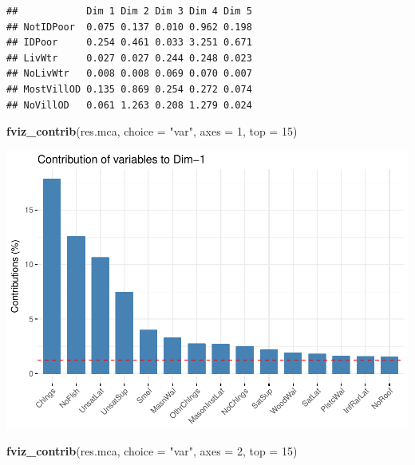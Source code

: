 \documentclass[11pt,]{article}
\newenvironment{Shaded}{\begin{snugshade}}{\end{snugshade}}
\newcommand{\DataTypeTok}[1]{\textcolor[rgb]{0.13,0.29,0.53}{#1}}
\newcommand{\DecValTok}[1]{\textcolor[rgb]{0.00,0.00,0.81}{#1}}
\newcommand{\KeywordTok}[1]{\textcolor[rgb]{0.13,0.29,0.53}{\textbf{#1}}}
\newcommand{\NormalTok}[1]{#1}
\newcommand{\OperatorTok}[1]{\textcolor[rgb]{0.81,0.36,0.00}{\textbf{#1}}}
\newcommand{\StringTok}[1]{\textcolor[rgb]{0.31,0.60,0.02}{#1}}
\begin{document}
\begin{Shaded}
\end{Shaded}

\begin{verbatim}
##            Dim 1 Dim 2 Dim 3 Dim 4 Dim 5
## NotIDPoor  0.075 0.137 0.010 0.962 0.198
## IDPoor     0.254 0.461 0.033 3.251 0.671
## LivWtr     0.027 0.027 0.244 0.248 0.023
## NoLivWtr   0.008 0.008 0.069 0.070 0.007
## MostVillOD 0.135 0.869 0.254 0.272 0.074
## NoVillOD   0.061 1.263 0.208 1.279 0.024
\end{verbatim}

\begin{Shaded}
\begin{Highlighting}[]
\KeywordTok{fviz_contrib}\NormalTok{(res.mca, }\DataTypeTok{choice =} \StringTok{"var"}\NormalTok{, }\DataTypeTok{axes =} \DecValTok{1}\NormalTok{, }\DataTypeTok{top =} \DecValTok{15}\NormalTok{)}
\end{Highlighting}
\end{Shaded}

\includegraphics{describe_FSMintentions_regional_seasonal_iDE-Camb_surveysOct2017_files/figure-latex/MCA_results-10.pdf}

\begin{Shaded}
\begin{Highlighting}[]
\KeywordTok{fviz_contrib}\NormalTok{(res.mca, }\DataTypeTok{choice =} \StringTok{"var"}\NormalTok{, }\DataTypeTok{axes =} \DecValTok{2}\NormalTok{, }\DataTypeTok{top =} \DecValTok{15}\NormalTok{)}
\end{Highlighting}
\end{Shaded}
\end{document}
